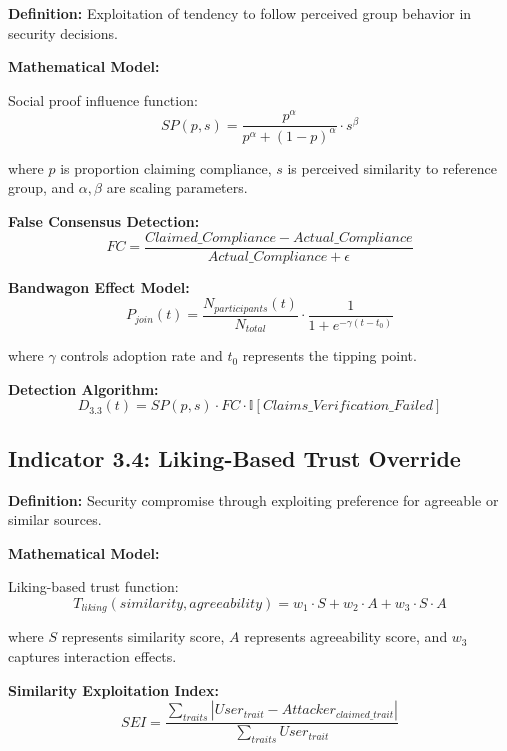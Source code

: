 \documentclass[11pt,a4paper]{article}
\begin{document}
\textbf{Definition:} Exploitation of tendency to follow perceived group behavior in security decisions.

\textbf{Mathematical Model:}

Social proof influence function:
\begin{equation}
SP(p,s) = \frac{p^{\alpha}}{p^{\alpha} + (1-p)^{\alpha}} \cdot s^{\beta}
\end{equation}

where $p$ is proportion claiming compliance, $s$ is perceived similarity to reference group, and $\alpha, \beta$ are scaling parameters.

\textbf{False Consensus Detection:}
\begin{equation}
FC = \frac{Claimed\_Compliance - Actual\_Compliance}{Actual\_Compliance + \epsilon}
\end{equation}

\textbf{Bandwagon Effect Model:}
\begin{equation}
P_{join}(t) = \frac{N_{participants}(t)}{N_{total}} \cdot \frac{1}{1 + e^{-\gamma(t - t_0)}}
\end{equation}

where $\gamma$ controls adoption rate and $t_0$ represents the tipping point.

\textbf{Detection Algorithm:}
\begin{equation}
D_{3.3}(t) = SP(p,s) \cdot FC \cdot \mathbb{I}[Claims\_Verification\_Failed]
\end{equation}

\subsection{Indicator 3.4: Liking-Based Trust Override}

\textbf{Definition:} Security compromise through exploiting preference for agreeable or similar sources.

\textbf{Mathematical Model:}

Liking-based trust function:
\begin{equation}
T_{liking}(similarity, agreeability) = w_1 \cdot S + w_2 \cdot A + w_3 \cdot S \cdot A
\end{equation}

where $S$ represents similarity score, $A$ represents agreeability score, and $w_3$ captures interaction effects.

\textbf{Similarity Exploitation Index:}
\begin{equation}
SEI = \frac{\sum_{traits} |User_{trait} - Attacker_{claimed\_trait}|}{\sum_{traits} User_{trait}}
\end{equation}
\end{document}
